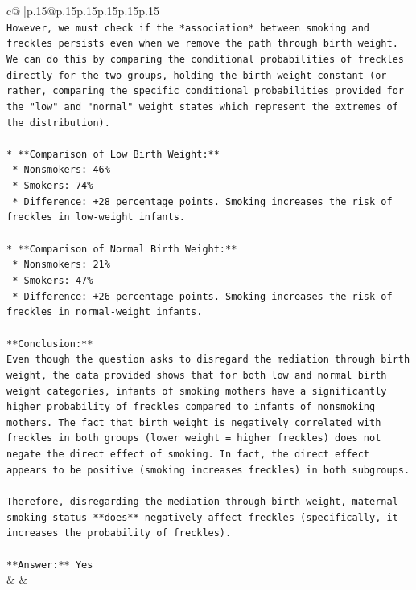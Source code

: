 \documentclass{article}
\begin{document}
{\begin{supertabular}{c@{$\;$}|p{.15\linewidth}@{}p{.15\linewidth}p{.15\linewidth}p{.15\linewidth}p{.15\linewidth}p{.15\linewidth}}
{{{\\ 
\texttt{However, we must check if the *association* between smoking and freckles persists even when we remove the path through birth weight. We can do this by comparing the conditional probabilities of freckles directly for the two groups, holding the birth weight constant (or rather, comparing the specific conditional probabilities provided for the "low" and "normal" weight states which represent the extremes of the distribution).} \\
\\ 
\texttt{*   **Comparison of Low Birth Weight:**} \\
\texttt{    *   Nonsmokers: 46\%} \\
\texttt{    *   Smokers: 74\%} \\
\texttt{    *   Difference: +28 percentage points. Smoking increases the risk of freckles in low{-}weight infants.} \\
\\ 
\texttt{*   **Comparison of Normal Birth Weight:**} \\
\texttt{    *   Nonsmokers: 21\%} \\
\texttt{    *   Smokers: 47\%} \\
\texttt{    *   Difference: +26 percentage points. Smoking increases the risk of freckles in normal{-}weight infants.} \\
\\ 
\texttt{**Conclusion:**} \\
\texttt{Even though the question asks to disregard the mediation through birth weight, the data provided shows that for both low and normal birth weight categories, infants of smoking mothers have a significantly higher probability of freckles compared to infants of nonsmoking mothers. The fact that birth weight is negatively correlated with freckles in both groups (lower weight = higher freckles) does not negate the direct effect of smoking. In fact, the direct effect appears to be positive (smoking increases freckles) in both subgroups.} \\
\\ 
\texttt{Therefore, disregarding the mediation through birth weight, maternal smoking status **does** negatively affect freckles (specifically, it increases the probability of freckles).} \\
\\ 
\texttt{**Answer:** Yes} \\
            }
        }
    }
    & & \\ \\


\end{supertabular}}
\end{document}
